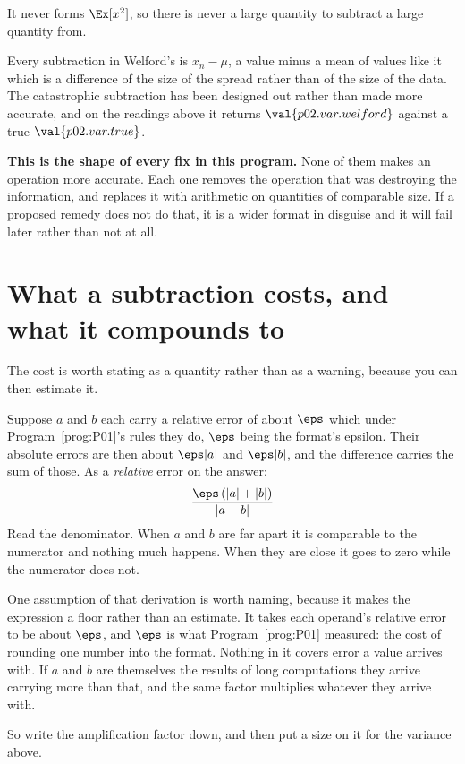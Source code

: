 \begin{fr}
\begin{ansblock}
It never forms $\Ex[x^{2}]$, so there is never a large quantity to subtract a
large quantity from.
\end{ansblock}

Every subtraction in Welford's is $x_n - \mu$, a value minus a mean of values
like it \dash{} which is a difference of the size of the spread rather than of
the size of the data. The catastrophic subtraction has been designed out
rather than made more accurate, and on the readings above it returns
$\val{p02.var.welford}$ against a true $\val{p02.var.true}$.

\begin{warning}
\textbf{This is the shape of every fix in this program.} None of them makes an
operation more accurate. Each one removes the operation that was destroying the
information, and replaces it with arithmetic on quantities of comparable size.
If a proposed remedy does not do that, it is a wider format in disguise and it
will fail later rather than not at all.
\end{warning}
\end{fr}

\section{What a subtraction costs, and what it compounds to}
\label{sec:P02-cost}

\begin{fr}
The cost is worth stating as a quantity rather than as a warning, because you
can then estimate it.

Suppose $a$ and $b$ each carry a relative error of about $\eps$ \dash{} which
under Program~\ref{prog:P01}'s rules they do, $\eps$ being the format's
epsilon. Their absolute errors are then about $\eps|a|$ and $\eps|b|$, and the
difference carries the sum of those. As a \emph{relative} error on the answer:
\[ \frac{\eps\left(|a| + |b|\right)}{|a - b|} \]
Read the denominator. When $a$ and $b$ are far apart it is comparable to the
numerator and nothing much happens. When they are close it goes to zero while
the numerator does not.

One assumption of that derivation is worth naming, because it makes the
expression a floor rather than an estimate. It takes each operand's relative
error to be about $\eps$, and $\eps$ is what Program~\ref{prog:P01} measured:
the cost of rounding one number into the format. Nothing in it covers error a
value arrives with. If $a$ and $b$ are themselves the results of long
computations they arrive carrying more than that, and the same factor
multiplies whatever they arrive with.

So write the amplification factor down, and then put a size on it for the
variance above.
\dotline
\nextframe
\end{fr}

